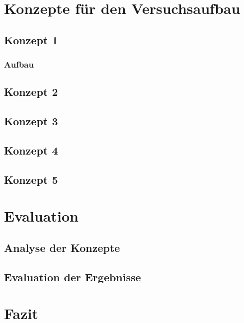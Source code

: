 
\chapter{Konzepte f\"{u}r den Versuchsaufbau}\label{ch:implementation}
\section{Konzept 1}
\subsection{Aufbau}
\section{Konzept 2}
\section{Konzept 3}
\section{Konzept 4}
\section{Konzept 5}


\chapter{Evaluation}\label{ch:conclusion}

\section{Analyse der Konzepte}
\section{Evaluation der Ergebnisse}

\chapter{Fazit}\label{ch:conclusion}


